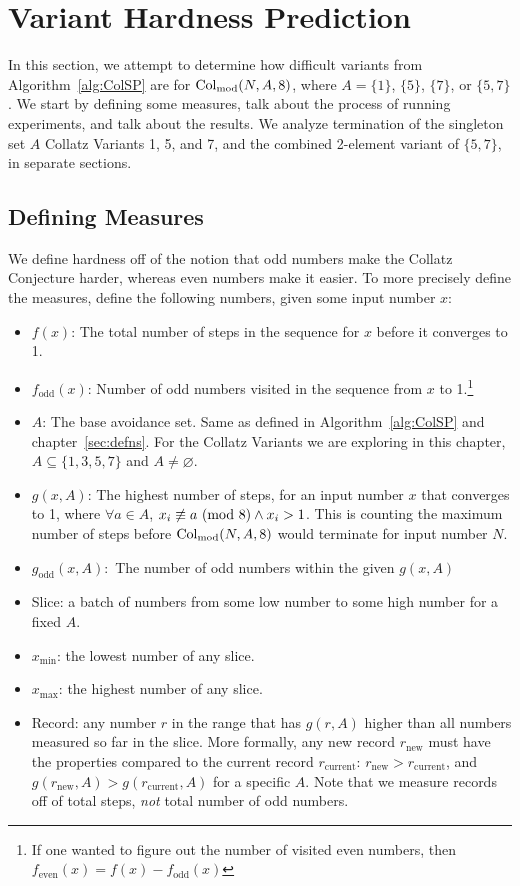 \chapter{Variant Hardness Prediction} \label{sec:subhrdnspred}
In this section, we attempt to determine how difficult variants from Algorithm~\ref{alg:ColSP} are for $\mathrm{Col}_{\text{mod}}(N,A,8)$, where $A= \{1\}$, $\{5\}$, $\{7\}$, or $\{5,7\}$. We start by defining some measures, talk about the process of running experiments, and talk about the results. We analyze termination of the singleton set $A$ Collatz Variants 1, 5, and 7, and the combined 2-element variant of $\{5,7\}$, in separate sections. 
\section{Defining Measures} \label{subsec:algdefinemeasure} 
We define hardness off of the notion that odd numbers make the Collatz Conjecture harder, whereas even numbers make it easier. To more precisely define the measures, define the following numbers, given some input number $x$:
\begin{itemize}
    \item $f(x)$: The total number of steps in the sequence for $x$ before it converges to 1.
    \item $f_\text{odd}(x)$: Number of odd numbers visited in the sequence from $x$ to 1.\footnote{If one wanted to figure out the number of visited even numbers, then $f_\text{even}(x) = f(x) - f_\text{odd}(x)$} 
    \item $A$: The base avoidance set. Same as defined in Algorithm~\ref{alg:ColSP} and chapter~\ref{sec:defns}. For the Collatz Variants we are exploring in this chapter, $A \subseteq \{1, 3, 5, 7\}$ and $A \ne \varnothing$.
    \item $g(x,A)$: The highest number of steps, for an input number $x$ that converges to 1, where $\forall a \in A$, $x_i \not\equiv a \ (\mathrm{mod}\ 8) \wedge x_i > 1$. This is counting the maximum number of steps before $\mathrm{Col}_{\text{mod}}(N,A,8)$ would terminate for input number $N$.
    \item $g_\text{odd}(x,A):$ The number of odd numbers within the given $g(x,A)$
    \item Slice: a batch of numbers from some low number to some high number for a fixed $A$.
    \item $x_{\min}$: the lowest number of any slice.
    \item $x_{\max}$: the highest number of any slice.

    \item Record: any number $r$ in the range that has $g(r,A)$ higher than all numbers measured so far in the slice. More formally, any new record $r_\text{new}$ must have the properties compared to the current record $r_\text{current}$: $r_\text{new} > r_\text{current}$, and $g(r_\text{new},A) > g(r_\text{current},A)$ for a specific $A$. Note that we measure records off of total steps, \textit{not} total number of odd numbers.
      
\end{itemize}
